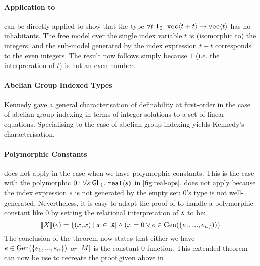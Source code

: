 
\paragraph{Application to }
 can be directly applied to show that the
type $\forall t\mathord:\mathsf{T}_2.~\textup{\texttt{vec}}\langle t + t \rangle \to
\textup{\texttt{vec}}\langle t \rangle$ has no inhabitants. The free model over the single
index variable $t$ is (isomorphic to) the integers, and the sub-model
generated by the index expression $t + t$ corresponds to the even
integers. The result now follows simply because $1$ (i.e. the
interpreration of $t$) is not an even number.

\paragraph{Abelian Group Indexed Types} Kennedy
\cite{kennedy97relational} gave a general characterisation of
definability at first-order in the case of abelian group indexing in
terms of integer solutions to a set of linear equations. Specialising
 to the case of abelian group indexing
yields Kennedy's characterisation.

\paragraph{Polymorphic Constants}  does not
apply in the case when we have polymorphic constants. This is the case
with the polymorphic $0 : \forall
s\mathord:\mathsf{GL}_1.~\textup{\texttt{real}}\langle s \rangle$ in
\autoref{fig:real-ops}.  does not apply
because the index expression $s$ is not generated by the empty set:
$0$'s type is not well-generated. Nevertheless, it is easy to adapt
the proof of  to handle a polymorphic
constant like $0$ by setting the relational interpretation of
$\textup{\texttt{X}}$ to be:
\begin{displaymath}
  \llbracket X \rrbracket(e) = \{ (x,x) \mathrel| x \in \left| \textup{\texttt{X}}\right| \land (x = 0 \lor e \in \mathrm{Gen}(\{e_1,...,e_n\})) \}
\end{displaymath}
The conclusion of the theorem now states that either we have $e \in
\mathrm{Gen}(\{e_1,...,e_n\})$ \emph{or} $\left| M\right|$ is the constant $0$
function. This extended theorem can now be use to recreate the proof
given above in .

